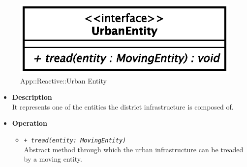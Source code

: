 \begin{figure}[h]
\centering
\includegraphics[scale=0.6,keepaspectratio]{images/solution/urban_entity.eps}
\caption{App::Reactive::Urban Entity}
\label{fig:sd-app-urban-entity}
\end{figure}
\FloatBarrier
\begin{itemize}
  \item \textbf{Description} \\
    It represents one of the entities the district infrastructure is composed
    of.
  \item \textbf{Operation}
  \begin{itemize} 
    \item \texttt{\textit{+ tread(entity: MovingEntity)}} \\
    Abstract method through which the urban infrastructure can be treaded by a
    moving entity.
  \end{itemize}
\end{itemize}
